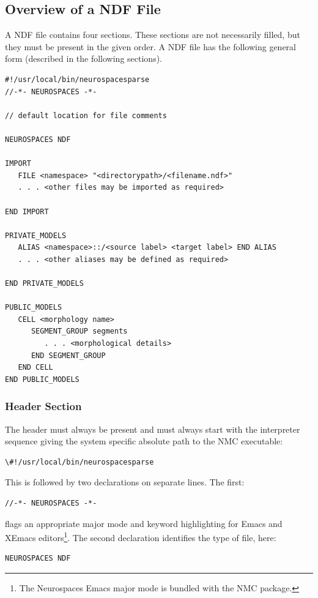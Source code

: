 \documentclass[12pt]{article}
\begin{document}
\subsection{Overview of a NDF File}
\label{sec:overview-ndf-file}

A NDF file contains four sections. These sections are not necessarily
filled, but they must be present in the given order.  A NDF file has
the following general form (described in the following sections).

\begin{verbatim}
#!/usr/local/bin/neurospacesparse
//-*- NEUROSPACES -*-

// default location for file comments

NEUROSPACES NDF

IMPORT
   FILE <namespace> "<directorypath>/<filename.ndf>"
   . . . <other files may be imported as required>

END IMPORT

PRIVATE_MODELS
   ALIAS <namespace>::/<source label> <target label> END ALIAS
   . . . <other aliases may be defined as required>

END PRIVATE_MODELS

PUBLIC_MODELS
   CELL <morphology name>
      SEGMENT_GROUP segments
         . . . <morphological details>
      END SEGMENT_GROUP
   END CELL
END PUBLIC_MODELS
\end{verbatim}

\subsubsection{Header Section}

The header must always be present and must always start with the
interpreter sequence giving the system specific absolute path to the
NMC executable:

\begin{verbatim}
\#!/usr/local/bin/neurospacesparse
\end{verbatim}

This is followed by two declarations on separate lines. The first:
\begin{verbatim}
//-*- NEUROSPACES -*-
\end{verbatim}
flags an appropriate major mode and keyword highlighting for Emacs and
XEmacs editors\footnote{The Neurospaces Emacs major mode is bundled
  with the NMC package.}. The second declaration identifies the type
of file, here:
\begin{verbatim}
NEUROSPACES NDF
\end{verbatim}
\end{document}
